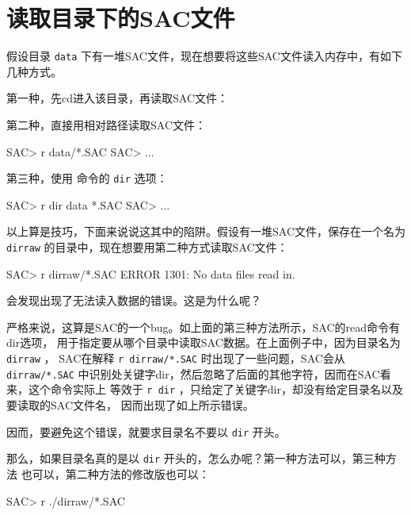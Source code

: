 \section{读取目录下的SAC文件}
\label{sec:read-dir}
假设目录 \texttt{data} 下有一堆SAC文件，现在想要将这些SAC文件读入内存中，有如下
几种方式。

第一种，先cd进入该目录，再读取SAC文件：

第二种，直接用相对路径读取SAC文件：
\begin{SACCode}
SAC> r data/*.SAC
SAC> ...
\end{SACCode}

第三种，使用 命令的 \texttt{dir} 选项：
\begin{SACCode}
SAC> r dir data *.SAC
SAC> ...
\end{SACCode}

以上算是技巧，下面来说说这其中的陷阱。假设有一堆SAC文件，保存在一个名为
\texttt{dirraw} 的目录中，现在想要用第二种方式读取SAC文件：
\begin{SACCode}
SAC> r dirraw/*.SAC
 ERROR 1301: No data files read in.
\end{SACCode}
会发现出现了无法读入数据的错误。这是为什么呢？

严格来说，这算是SAC的一个bug。如上面的第三种方法所示，SAC的read命令有dir选项，
用于指定要从哪个目录中读取SAC数据。在上面例子中，因为目录名为 \texttt{dirraw} ，
SAC在解释 \texttt{r dirraw/*.SAC} 时出现了一些问题，SAC会从 \texttt{dirraw/*.SAC} 
中识别处关键字dir，然后忽略了后面的其他字符，因而在SAC看来，这个命令实际上
等效于 \texttt{r dir} ，只给定了关键字dir，却没有给定目录名以及要读取的SAC文件名，
因而出现了如上所示错误。

因而，要避免这个错误，就要求目录名不要以 \texttt{dir} 开头。

那么，如果目录名真的是以 \texttt{dir} 开头的，怎么办呢？第一种方法可以，第三种方法
也可以，第二种方法的修改版也可以：
\begin{SACCode}
SAC> r ./dirraw/*.SAC
\end{SACCode}
